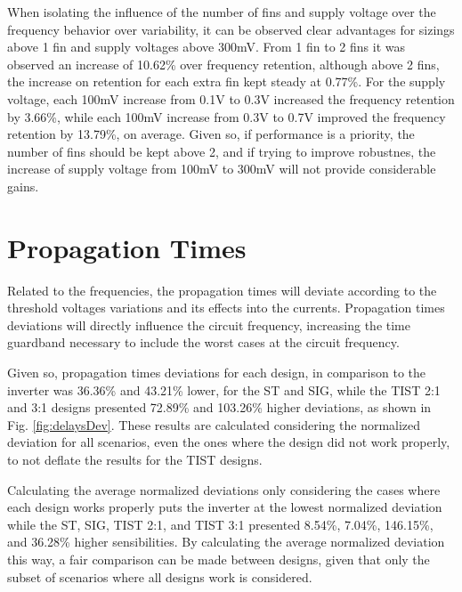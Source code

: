 \documentclass[pgmicro,diss,english]{iiufrgs}
\begin{document}
When isolating the influence of the number of fins and supply voltage over the frequency behavior over variability, it can be observed clear advantages for sizings above 1 fin and supply voltages above 300mV. From 1 fin to 2 fins it was observed an increase of 10.62\% over frequency retention, although above 2 fins, the increase on retention for each extra fin kept steady at 0.77\%. For the supply voltage, each 100mV increase from 0.1V to 0.3V increased the frequency retention by 3.66\%, while each 100mV increase from 0.3V to 0.7V improved the frequency retention by 13.79\%, on average. Given so, if performance is a priority, the number of fins should be kept above 2, and if trying to improve robustnes, the increase of supply voltage from 100mV to 300mV will not provide considerable gains.


\section{Propagation Times}

\vspace{-0.5cm}

Related to the frequencies, the propagation times will deviate according to the threshold voltages variations and its effects into the currents. Propagation times deviations will directly influence the circuit frequency, increasing the time guardband necessary to include the worst cases at the circuit frequency.

Given so, propagation times deviations for each design, in comparison to the inverter was 36.36\% and 43.21\% lower, for the ST and SIG, while the TIST 2:1 and 3:1 designs presented 72.89\% and 103.26\% higher deviations, as shown in Fig. \ref{fig:delaysDev}. These results are calculated considering the normalized deviation for all scenarios, even the ones where the design did not work properly, to not deflate the results for the TIST designs.

Calculating the average normalized deviations only considering the cases where each design works properly puts the inverter at the lowest normalized deviation while the ST, SIG, TIST 2:1, and TIST 3:1 presented 8.54\%, 7.04\%, 146.15\%, and 36.28\% higher sensibilities. By calculating the average normalized deviation this way, a fair comparison can be made between designs, given that only the subset of scenarios where all designs work is considered.
\end{document}
